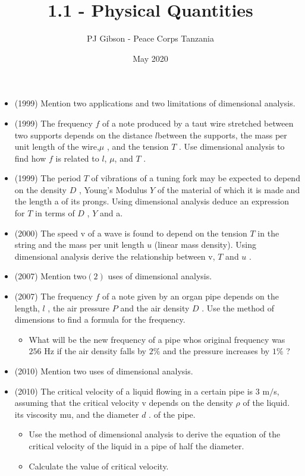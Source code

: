 \documentclass{article}
\title{\textbf{1.1 - Physical Quantities}}
\author{PJ Gibson - Peace Corps Tanzania}
\date{May 2020}
\begin{document}
\maketitle

\begin{itemize}
\item (1999)  Mention two applications and two limitations of dimensional analysis.
\item (1999)  The frequency $ f$ of a note produced by a taut wire stretched between two supports depends on the distance ​ $ l$ ​ between the supports, the mass per unit length of the wire,$ \mu $ , and the tension $ T$ . Use dimensional analysis to find how $ f$ is related to ​ $ l$ ​ , $\mu$, and $ T$ .
\item (1999)  The period $ T$ of vibrations of a tuning fork may be expected to depend on the density $ D$ , Young's Modulus $ Y$ of the material of which it is made and the length a of its prongs. Using dimensional analysis deduce an expression for $ T$ in terms of $ D$ , $ Y$ and a.
\item (2000)  The speed v of a wave is found to depend on the tension $ T$ in the string and the mass per unit length $ u$ (linear mass density). Using dimensional analysis derive the relationship between v, $ T$ and $ u$ .
\item (2007)  Mention two$ (2)$ uses of dimensional analysis.
\item (2007)  The frequency $ f$ of a note given by an organ pipe depends on the length, $ l$ , the air pressure $ P$ and the air density $ D$ .  Use the method of dimensions to find a formula for the frequency.
 \begin{itemize}
\item What will be the new frequency of a pipe whos original frequency was $ 256$ Hz if the air density falls by $ 2\%$ and the pressure increases by $ 1\%$ ?
\end{itemize}
\item (2010)  Mention two uses of dimensional analysis.
\item (2010)  The critical velocity of a liquid flowing in a certain pipe is $ 3$ m$/$s, assuming that the critical velocity v depends on the density $ \rho $ of the liquid. its viscosity mu, and the diameter $ d$ . of the pipe. 
 \begin{itemize}
\item Use the method of dimensional analysis to derive the equation of the critical velocity of the liquid in a pipe of half the diameter.
\item Calculate the value of critical velocity.

\end{itemize}
\end{itemize}
\end{document}
